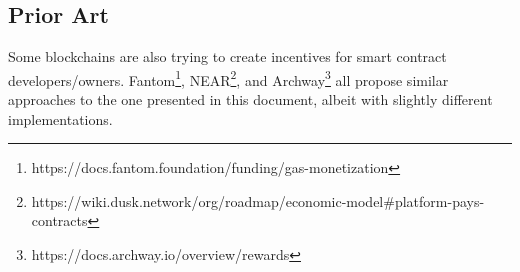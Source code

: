 \documentclass[twocolumn, nofootinbib]{revtex4-2} %
\begin{document}
    \vspace{0.3cm}

    \subsection*{Prior Art}\label{subsec:prior-art}
    Some blockchains are also trying to create incentives for smart contract
    developers/owners.
    Fantom\footnote{https://docs.fantom.foundation/funding/gas-monetization},
    NEAR\footnote{https://wiki.dusk.network/org/roadmap/economic-model\#platform-pays-contracts},
    and Archway\footnote{https://docs.archway.io/overview/rewards} all propose
    similar approaches to the one presented in this document, albeit with
    slightly different implementations.
\end{document}
